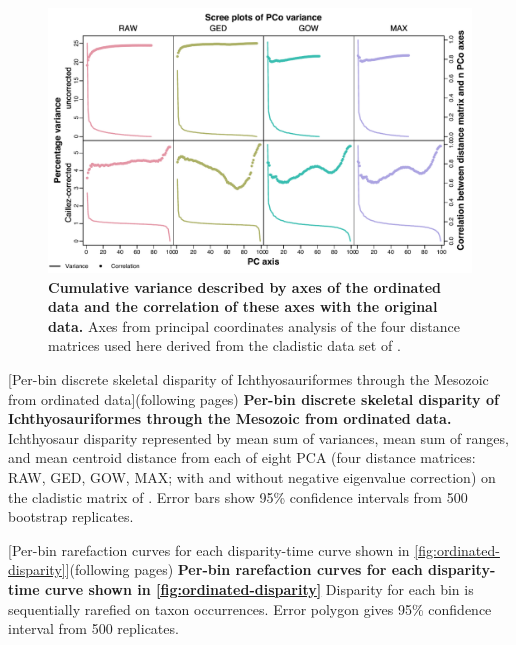 \documentclass[british,a4paper]{article}
\begin{document}
\begin{figure}[h]
    \caption[Cumulative variance described by axes of the ordinated data
        and the correlation of these axes with the original data
        set]{\textbf{Cumulative variance described by axes of the ordinated data and
        the correlation of these axes with the original data.} Axes from principal
        coordinates analysis of the four distance matrices used here derived from
        the cladistic data set of
        \textcite{Moon2018JSP}.\label{fig:ordination-correlation}}
    \includegraphics[width = \textwidth]{supp_figures/figS4-scree_plot.pdf}
\end{figure}

\noindent\begin{minipage}[c]{\textwidth}
    [Per-bin discrete skeletal disparity of Ichthyosauriformes through
        the Mesozoic from ordinated data]{(following pages) \textbf{Per-bin discrete
        skeletal disparity of Ichthyosauriformes through the Mesozoic from ordinated
        data.} Ichthyosaur disparity represented by mean sum of variances, mean sum
        of ranges, and mean centroid distance from each of eight PCA (four distance
        matrices: RAW, GED, GOW, MAX\@; with and without negative eigenvalue correction)
        on the cladistic matrix of \textcite{Moon2018JSP}. Error bars show 95\% confidence
        intervals from 500 bootstrap replicates.\label{fig:ordinated-disparity}}
\end{minipage}


\noindent\begin{minipage}[c]{\textwidth}
    [Per-bin rarefaction curves for each disparity-time curve shown in
        \cref{fig:ordinated-disparity}]{(following pages) \textbf{Per-bin
        rarefaction curves for each disparity-time curve shown in
        \cref{fig:ordinated-disparity}} Disparity for each bin is sequentially
        rarefied on taxon occurrences. Error polygon gives 95\% confidence interval from
        500 replicates.\label{fig:rarefaction-curves}}
\end{minipage}

\end{document}
